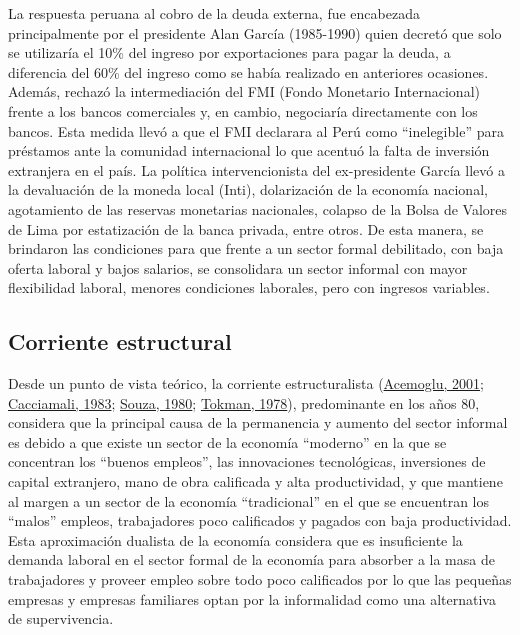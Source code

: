 \documentclass[
  letterpaper,
  12pt,
  oneside,
  spanish,
  doublespacing,
  headsepline,
  parskip]{MastersDoctoralThesis}
\begin{document}
La respuesta peruana al cobro de la deuda externa, fue encabezada
principalmente por el presidente Alan García (1985-1990) quien decretó
que solo se utilizaría el 10\% del ingreso por exportaciones para pagar
la deuda, a diferencia del 60\% del ingreso como se había realizado en
anteriores ocasiones. Además, rechazó la intermediación del FMI (Fondo
Monetario Internacional) frente a los bancos comerciales y, en cambio,
negociaría directamente con los bancos. Esta medida llevó a que el FMI
declarara al Perú como ``inelegible'' para préstamos ante la comunidad
internacional lo que acentuó la falta de inversión extranjera en el
país. La política intervencionista del ex-presidente García llevó a la
devaluación de la moneda local (Inti), dolarización de la economía
nacional, agotamiento de las reservas monetarias nacionales, colapso de
la Bolsa de Valores de Lima por estatización de la banca privada, entre
otros. De esta manera, se brindaron las condiciones para que frente a un
sector formal debilitado, con baja oferta laboral y bajos salarios, se
consolidara un sector informal con mayor flexibilidad laboral, menores
condiciones laborales, pero con ingresos variables.

\hypertarget{corriente-estructural}{%
\subsection{Corriente estructural}\label{corriente-estructural}}

Desde un punto de vista teórico, la corriente estructuralista
(\protect\hyperlink{ref-acemoglu2001}{Acemoglu, 2001};
\protect\hyperlink{ref-cacciamali1983}{Cacciamali, 1983};
\protect\hyperlink{ref-souza1980}{Souza, 1980};
\protect\hyperlink{ref-tokman1978}{Tokman, 1978}), predominante en los
años 80, considera que la principal causa de la permanencia y aumento
del sector informal es debido a que existe un sector de la economía
``moderno'' en la que se concentran los ``buenos empleos'', las
innovaciones tecnológicas, inversiones de capital extranjero, mano de
obra calificada y alta productividad, y que mantiene al margen a un
sector de la economía ``tradicional'' en el que se encuentran los
``malos'' empleos, trabajadores poco calificados y pagados con baja
productividad. Esta aproximación dualista de la economía considera que
es insuficiente la demanda laboral en el sector formal de la economía
para absorber a la masa de trabajadores y proveer empleo sobre todo poco
calificados por lo que las pequeñas empresas y empresas familiares optan
por la informalidad como una alternativa de supervivencia.
\end{document}
